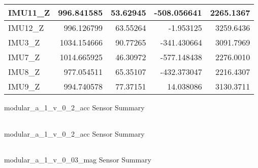 \documentclass[]{article}
\begin{document}
\begin{table}[!h]
\begin{tabular}{l|r|r|r|r}
\hline
IMU11\_Z & 996.841585 & 53.62945 & -508.056641 & 2265.1367\\
\hline
IMU12\_Z & 996.126799 & 63.55264 & -1.953125 & 3259.6436\\
\hline
IMU3\_Z & 1034.154666 & 90.77265 & -341.430664 & 3091.7969\\
\hline
IMU7\_Z & 1014.665925 & 46.30972 & -577.148438 & 2276.0010\\
\hline
IMU8\_Z & 977.054511 & 65.35107 & -432.373047 & 2216.4307\\
\hline
IMU9\_Z & 994.740578 & 77.37151 & 14.038086 & 3130.3711\\
\hline
\end{tabular}
\end{table}

modular\_a\_1\_v\_0\_2\_acc Sensor Summary

\begin{table}[!h]
\centering
\begin{tabular}{}
\hline

\hline
\end{tabular}
\end{table}

modular\_a\_1\_v\_0\_2\_acc Sensor Summary

\begin{table}[!h]
\centering
\begin{tabular}{}
\hline

\hline
\end{tabular}
\end{table}

modular\_a\_1\_v\_0\_03\_mag Sensor Summary
\end{document}
